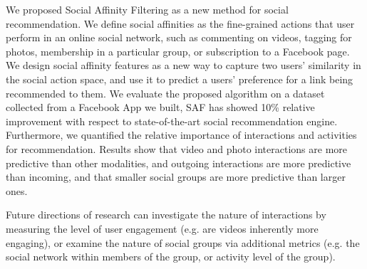 
We proposed Social Affinity Filtering as a new method for social recommendation.
We define social affinities as the fine-grained actions that user perform in an
online social network, such as commenting on videos, tagging for photos, 
membership in a particular group, or subscription to a Facebook page. 
We design social affinity features as a new way to capture two users' similarity 
in the social action space, and use it to predict a users' preference for a link
being recommended to them. 
We evaluate the proposed algorithm on a dataset collected from a Facebook App we built, 
SAF has showed 10\% relative improvement with respect to 
state-of-the-art social recommendation engine. 
Furthermore, we quantified the relative importance of interactions and activities
for recommendation. Results show that video and photo interactions are more predictive 
than other modalities, and outgoing interactions are more predictive than incoming, 
and that smaller social groups are more predictive than larger ones. 

Future directions of research can investigate the nature of interactions by measuring 
the level of user engagement (e.g. are videos inherently more engaging), 
or examine the nature of social groups via additional metrics (e.g. the social network within members of the group, or activity level of the group). 